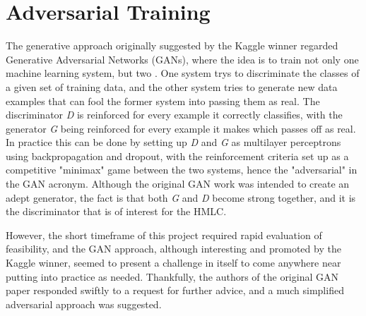 \documentclass          {article} %
\begin{document}

               \section {Adversarial Training}
               \label   {sec:adversarial_training}

The generative approach originally suggested by the Kaggle winner regarded Generative Adversarial Networks (GANs), where the idea is to train not only one machine learning system, but two \cite{Goodfellow2014}. One system trys to discriminate the classes of a given set of training data, and the other system tries to generate new data examples that can fool the former system into passing them as real. The discriminator \textit{D} is reinforced for every example it correctly classifies, with the generator \textit{G} being reinforced for every example it makes which passes off as real. In practice this can be done by setting up \textit{D} and \textit{G} as multilayer perceptrons using backpropagation and dropout, with the reinforcement criteria set up as a competitive "minimax" game between the two systems, hence the "adversarial" in the GAN acronym. Although the original GAN work was intended to create an adept generator, the fact is that both \textit{G} and \textit{D} become strong together, and it is the discriminator that is of interest for the HMLC.


However, the short timeframe of this project required rapid evaluation of feasibility, and the GAN approach, although interesting and promoted by the Kaggle winner, seemed to present a challenge in itself to come anywhere near putting into practice as needed. Thankfully, the authors of the original GAN paper responded swiftly to a request for further advice, and a much simplified adversarial approach was suggested.
\end{document}
